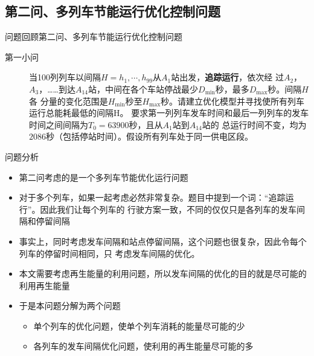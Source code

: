 \documentclass{beamer}
\newcommand\Emph{\textbf}
\begin{document}
\subsection{第二问、多列车节能运行优化控制问题}

\begin{frame}{问题回顾}{第二问、多列车节能运行优化控制问题}
\begin{description}
  \item[第一小问] 当100列列车以间隔$H={h_1,\cdots,h_{99}}$从$A_1$站出发，\Emph{追踪运行}，依次经
  过$A_2$，$A_3$，……到达$A_{14}$站，中间在各个车站停战最少$D_{\min}$秒，最多$D_{\max}$秒。间隔$H$各
  分量的变化范围是$H_{\min}$秒至$H_{\max}$秒。请建立优化模型并寻找使所有列车运行总能耗最低的间隔H。
  要求第一列列车发车时间和最后一列列车的发车时间之间间隔为$T_0=63900$秒，且从$A_1$站到$A_{14}$站的
  总运行时间不变，均为$2086$秒（包括停站时间）。假设所有列车处于同一供电区段。
\end{description}
\end{frame}

\begin{frame}{问题分析}
\begin{itemize}
  \item<1-> 第二问考虑的是一个多列车节能优化运行问题
  \item<2-> 对于多个列车，如果一起考虑必然非常复杂。题目中提到一个词：“追踪运行”。因此我们让每个列车的
  行驶方案一致，不同的仅仅只是各列车的发车间隔和停留间隔
  \item<3-> 事实上，同时考虑发车间隔和站点停留间隔，这个问题也很复杂，因此令每个列车的停留时间相同，只
  考虑发车间隔的优化。
  \item<4-> 本文需要考虑再生能量的利用问题，所以发车间隔的优化的目的就是尽可能的利用再生能量
  \item<5-> 于是本问题分解为两个问题
    \begin{itemize}
        \item<6-> 单个列车的优化问题，使单个列车消耗的能量尽可能的少
        \item<7-> 各列车的发车间隔优化问题，使利用的再生能量尽可能的多
    \end{itemize}
\end{itemize}

\end{frame}
\end{document}
